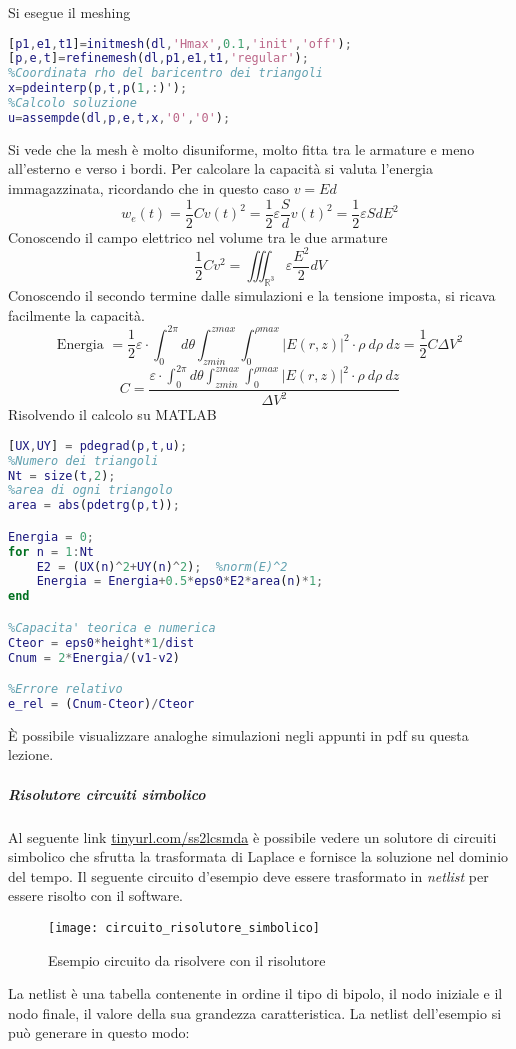 Si esegue il meshing
\begin{lstlisting}[style=Matlab-editor,language = Matlab]
[p1,e1,t1]=initmesh(dl,'Hmax',0.1,'init','off');
[p,e,t]=refinemesh(dl,p1,e1,t1,'regular');
%Coordinata rho del baricentro dei triangoli
x=pdeinterp(p,t,p(1,:)');
%Calcolo soluzione
u=assempde(dl,p,e,t,x,'0','0');
\end{lstlisting}
Si vede che la mesh è molto disuniforme, molto fitta tra le armature e meno
all'esterno e verso i bordi. Per calcolare la capacità si valuta l'energia
immagazzinata, ricordando che in questo caso $v=Ed$
$$
w_e(t) = \frac{1}{2}Cv(t)^2 = \frac{1}{2}\varepsilon\frac{S}{d}v(t)^2 = 
\frac{1}{2}\varepsilon SdE^2
$$
Conoscendo il campo elettrico nel volume tra le due armature
$$
\frac{1}{2}Cv^2 = \iiint_{\mathbb{R}^3}\varepsilon \frac{E^2}{2}dV
$$
Conoscendo il secondo termine dalle simulazioni e la tensione imposta, si ricava
facilmente la capacità.
$$
\text{Energia } = \frac{1}{2}\varepsilon\cdot\int_0^{2\pi} d\theta 
\int_{zmin}^{zmax}\int_0^{\rho max} \left|E(r,z)\right|^2\cdot \rho\ d\rho\ dz =
\frac{1}{2}C\Delta V^2
$$
$$
C = \frac{\varepsilon\cdot \int_0^{2\pi} d\theta 
\int_{zmin}^{zmax}\int_0^{\rho max} \left|E(r,z)\right|^2\cdot \rho\ d\rho\ dz}{\Delta V^2}
$$
Risolvendo il calcolo su MATLAB
\begin{lstlisting}[style=Matlab-editor,language = Matlab]
[UX,UY] = pdegrad(p,t,u);
%Numero dei triangoli
Nt = size(t,2);
%area di ogni triangolo
area = abs(pdetrg(p,t));    

Energia = 0;
for n = 1:Nt     
    E2 = (UX(n)^2+UY(n)^2);  %norm(E)^2
    Energia = Energia+0.5*eps0*E2*area(n)*1;
end

%Capacita' teorica e numerica
Cteor = eps0*height*1/dist
Cnum = 2*Energia/(v1-v2)

%Errore relativo
e_rel = (Cnum-Cteor)/Cteor
\end{lstlisting}
È possibile visualizzare analoghe simulazioni negli appunti in pdf
su questa lezione.

\subparagraph{Risolutore circuiti simbolico}
Al seguente link \href{http://143.225.92.177:54323/}{tinyurl.com/ss2lcsmda}
è possibile vedere un solutore di circuiti simbolico che sfrutta la 
trasformata di Laplace e fornisce la soluzione nel dominio del tempo.
Il seguente circuito d'esempio deve essere trasformato in \textit{netlist} per 
essere risolto con il software.
\begin{figure}[H]
\centering
\texttt{[image: circuito\_risolutore\_simbolico]}
\caption{Esempio circuito da risolvere con il risolutore}
\end{figure}
La netlist è una tabella contenente in ordine
il tipo di bipolo, il nodo iniziale e il
nodo finale, il valore della sua grandezza caratteristica.
La netlist dell'esempio si può generare in questo modo:


